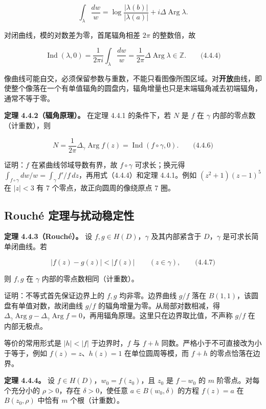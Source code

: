 \documentclass[11pt,a4paper]{article}
\begin{document}
\[
\int_\lambda\frac{dw}{w}
=\log\frac{|\lambda(b)|}{|\lambda(a)|}+i\Delta\operatorname{Arg}\lambda.
\]

对闭曲线，模的对数差为零，首尾辐角相差 \(2\pi\) 的整数倍，故

\[
\operatorname{Ind}(\lambda,0)
=\frac1{2\pi i}\int_\lambda\frac{dw}{w}
=\frac1{2\pi}\Delta\operatorname{Arg}\lambda\in\mathbb Z.
\qquad\text{(4.4.4)}
\]

像曲线可能自交，必须保留参数与重数，不能只看图像所围区域。对\textbf{开放}曲线，即使整个像落在一个有单值辐角的圆盘内，辐角增量也只是末端辐角减去初端辐角，通常不等于零。

\textbf{定理 4.4.2（辐角原理）。} 在定理 4.4.1 的条件下，若 \(N\) 是
\(f\) 在 \(\gamma\) 内部的零点数（计重数），则

\[
N=\frac1{2\pi}\Delta_\gamma\operatorname{Arg}f(z)
=\operatorname{Ind}(f\circ\gamma,0).
\qquad\text{(4.4.6)}
\]

证明：\(f\) 在紧曲线邻域导数有界，故 \(f\circ\gamma\) 可求长；换元得
\(\int_{f\circ\gamma}dw/w=\int_\gamma f'/f\,dz\)，再用式（4.4.4）和定理
4.4.1。例如 \((z^2+1)(z-1)^5\) 在 \(|z|<3\) 有 \(7\)
个零点，故正向圆周的像绕原点 \(7\) 圈。

\subsection{Rouché 定理与扰动稳定性}\label{ch04-s4-heading-3}

\textbf{定理 4.4.3（Rouché）。} 设 \(f,g\in H(D)\)，\(\gamma\)
及其内部紧含于 \(D\)，\(\gamma\) 是可求长简单闭曲线。若

\[
|f(z)-g(z)|<|f(z)|\qquad(z\in\gamma),
\qquad\text{(4.4.7)}
\]

则 \(f,g\) 在 \(\gamma\) 内部的零点数相同（计重数）。

证明：不等式首先保证边界上的 \(f,g\) 均非零。边界曲线 \(g/f\) 落在
\(B(1,1)\)，该圆盘有单值对数，故闭曲线 \(g/f\)
的辐角增量为零。从局部对数相减，得
\(\Delta_\gamma\operatorname{Arg}g-\Delta_\gamma\operatorname{Arg}f=0\)，再用辐角原理。这里只在边界取比值，不声称
\(g/f\) 在内部无极点。

等价的常用形式是 \(|h|<|f|\) 于边界时，\(f\) 与 \(f+h\)
同数。严格小于不可直接改为小于等于，例如 \(f(z)=z\)、\(h(z)=1\)
在单位圆周等模，而 \(f+h\) 的零点恰落在边界。

\textbf{定理 4.4.4。} 设 \(f\in H(D)\)，\(w_0=f(z_0)\)，且 \(z_0\) 是
\(f-w_0\) 的 \(m\) 阶零点。对每个充分小的 \(\rho>0\)，存在
\(\delta>0\)，使任意 \(a\in B(w_0,\delta)\) 的方程 \(f(z)=a\) 在
\(B(z_0,\rho)\) 中恰有 \(m\) 个根（计重数）。
\end{document}
